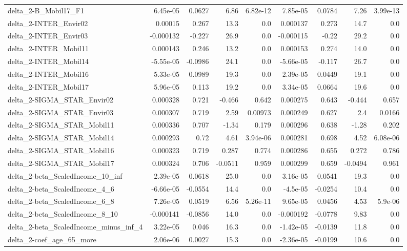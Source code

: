 \begin{tabular}{lrrrrrrrr}
delta_2-B_Mobil17_F1 & 6.45e-05 & 0.0627 & 6.86 & 6.82e-12 & 7.85e-05 & 0.0784 & 7.26 & 3.99e-13 \\
delta_2-INTER_Envir02 & 0.00015 & 0.267 & 13.3 & 0.0 & 0.000137 & 0.273 & 14.7 & 0.0 \\
delta_2-INTER_Envir03 & -0.000132 & -0.227 & 26.9 & 0.0 & -0.000115 & -0.22 & 29.2 & 0.0 \\
delta_2-INTER_Mobil11 & 0.000143 & 0.246 & 13.2 & 0.0 & 0.000153 & 0.274 & 14.0 & 0.0 \\
delta_2-INTER_Mobil14 & -5.55e-05 & -0.0986 & 24.1 & 0.0 & -5.66e-05 & -0.117 & 26.7 & 0.0 \\
delta_2-INTER_Mobil16 & 5.33e-05 & 0.0989 & 19.3 & 0.0 & 2.39e-05 & 0.0449 & 19.1 & 0.0 \\
delta_2-INTER_Mobil17 & 5.96e-05 & 0.113 & 19.2 & 0.0 & 3.34e-05 & 0.0664 & 19.6 & 0.0 \\
delta_2-SIGMA_STAR_Envir02 & 0.000328 & 0.721 & -0.466 & 0.642 & 0.000275 & 0.643 & -0.444 & 0.657 \\
delta_2-SIGMA_STAR_Envir03 & 0.000307 & 0.719 & 2.59 & 0.00973 & 0.000249 & 0.627 & 2.4 & 0.0166 \\
delta_2-SIGMA_STAR_Mobil11 & 0.000336 & 0.707 & -1.34 & 0.179 & 0.000296 & 0.638 & -1.28 & 0.202 \\
delta_2-SIGMA_STAR_Mobil14 & 0.000293 & 0.72 & 4.61 & 3.94e-06 & 0.000281 & 0.698 & 4.52 & 6.08e-06 \\
delta_2-SIGMA_STAR_Mobil16 & 0.000323 & 0.719 & 0.287 & 0.774 & 0.000286 & 0.655 & 0.272 & 0.786 \\
delta_2-SIGMA_STAR_Mobil17 & 0.000324 & 0.706 & -0.0511 & 0.959 & 0.000299 & 0.659 & -0.0494 & 0.961 \\
delta_2-beta_ScaledIncome_10_inf & 2.39e-05 & 0.0618 & 25.0 & 0.0 & 3.16e-05 & 0.0541 & 19.3 & 0.0 \\
delta_2-beta_ScaledIncome_4_6 & -6.66e-05 & -0.0554 & 14.4 & 0.0 & -4.5e-05 & -0.0254 & 10.4 & 0.0 \\
delta_2-beta_ScaledIncome_6_8 & 7.26e-05 & 0.0519 & 6.56 & 5.26e-11 & 9.65e-05 & 0.0456 & 4.53 & 5.9e-06 \\
delta_2-beta_ScaledIncome_8_10 & -0.000141 & -0.0856 & 14.0 & 0.0 & -0.000192 & -0.0778 & 9.83 & 0.0 \\
delta_2-beta_ScaledIncome_minus_inf_4 & 3.22e-05 & 0.046 & 16.3 & 0.0 & -1.42e-05 & -0.0139 & 11.8 & 0.0 \\
delta_2-coef_age_65_more & 2.06e-06 & 0.0027 & 15.3 & 0.0 & -2.36e-05 & -0.0199 & 10.6 & 0.0 \\

\end{tabular}
